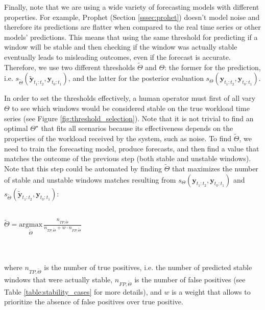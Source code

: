 \documentclass[a4paper, 12pt]{article} %
\begin{document}
	Finally, note that we are using a wide variety of forecasting models with different properties. For example, Prophet (Section \ref{sssec:prohet}) doesn't model noise and therefore its predictions are flatter when compared to the real time series or other models' predictions. This means that using the same threshold for predicting if a window will be stable and then checking if the window was actually stable eventually leads to misleading outcomes, even if the forecast is accurate. Therefore, we use two different thresholds $\tilde{\Theta}$ and $\Theta$: the former for the prediction, i.e. $s_{\tilde{\Theta}}(\tilde{\pmb{y}}_{t_1:t_2}, \pmb{y}_{t_0:t_1})$, and the latter for the posterior evaluation $s_\Theta(\pmb{y}_{t_1:t_2}, \pmb{y}_{t_0:t_1})$.
	
	In order to set the thresholds effectively, a human operator must first of all vary $\Theta$ to see which windows would be considered stable on the true workload time series (see Figure \ref{fig:threshold_selection}). Note that it is not trivial to find an optimal $\Theta^\star$ that fits all scenarios because its effectiveness depends on the properties of the workload received by the system, such as noise. To find $\tilde{\Theta}$, we need to train the forecasting model, produce forecasts, and then find a value that matches the outcome of the previous step (both stable and unstable windows). Note that this step could be automated by finding $\tilde{\Theta}$ that maximizes the number of stable and unstable windows matches resulting from $s_\Theta(\pmb{y}_{t_1:t_2}, \pmb{y}_{t_0:t_1})$ and $s_{\tilde{\Theta}}(\tilde{\pmb{y}}_{t_1:t_2}, \pmb{y}_{t_0:t_1})$: \\\\
	\centerline{
	$
		\tilde{\Theta} = \underset{ \tilde{\Theta}} {\mathrm{argmax}}\, \frac{n_{TP, \tilde{\Theta}} }{n_{TP, \tilde{\Theta}} + w \cdot n_{FP, \tilde{\Theta}}}
	$
	}\\\\
	where $n_{TP, \tilde{\Theta}}$ is the number of true positives, i.e. the number of predicted stable windows that were actually stable, $n_{FP, \tilde{\Theta}}$ is the number of false positives (see Table \ref{table:stability_cases} for more details), and $w$ is a weight that allows to prioritize the absence of false positives over true positive.
	
\end{document}
